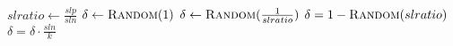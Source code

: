 \begin{center}
\begin{algorithmic}[1]
		\State \Return{$ \delta $}
	\EndIf
	\\
	\State $ slratio \gets \frac{slp}{sln} $
		\State $ \delta \gets \Call{Random}{1} $
		\State $ \delta \gets \Call{Random}{\frac{1}{slratio}} $
	\Else
		\State $ \delta = 1 - \Call{Random}{slratio} $
	\EndIf
	\\
		\State $ \delta = \delta \cdot \frac{sln}{k} $
	\EndIf
	\\
	\State \Return{$ \delta $}
\EndFunction
	\end{algorithmic}
\end{center}

